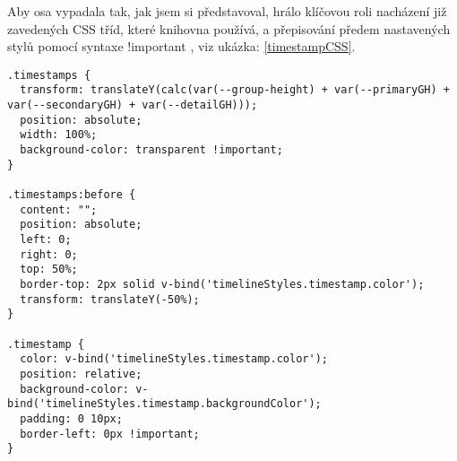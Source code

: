 Aby osa vypadala tak, jak jsem si představoval, hrálo klíčovou roli nacházení již zavedených CSS tříd, které knihovna používá, a přepisování předem nastavených stylů pomocí syntaxe !important \cite{important-css},
viz ukázka: \ref{timestampCSS}.  
\begin{lstlisting}[style=CSS, firstnumber = 356, caption={TimelineComp.vue, Timestamps style}, label={timestampCSS}]
.timestamps {  
  transform: translateY(calc(var(--group-height) + var(--primaryGH) + var(--secondaryGH) + var(--detailGH)));
  position: absolute;
  width: 100%;
  background-color: transparent !important;
}

.timestamps:before {
  content: "";
  position: absolute;
  left: 0;
  right: 0;
  top: 50%;
  border-top: 2px solid v-bind('timelineStyles.timestamp.color');
  transform: translateY(-50%);
}

.timestamp {
  color: v-bind('timelineStyles.timestamp.color');
  position: relative;
  background-color: v-bind('timelineStyles.timestamp.backgroundColor'); 
  padding: 0 10px;
  border-left: 0px !important; 
}
\end{lstlisting}


